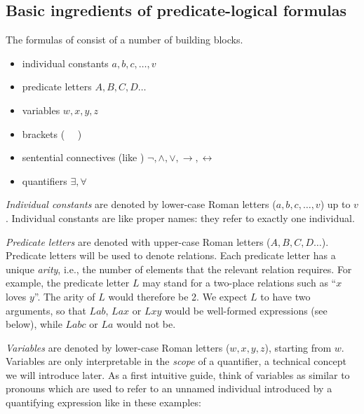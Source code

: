 \documentclass[nobib,nofonts]{tufte-handout}
\newcommand{\proplog}{\acro{PropLog}}
\newcommand{\predlog}{\acro{PredLog}}
\begin{document}
\subsection{Basic ingredients of predicate-logical formulas}

The formulas of \predlog consist of a number of building blocks.
\begin{itemize}
  \item individual constants \hfill $a,b,c, \dots, v$
  \item predicate letters \hfill $A, B, C, D \dots$
  \item variables \hfill $w, x,y,z$
  \item brackets \hfill ( \ \ )
  \item sentential connectives (like \proplog) \hfill $\neg, \wedge, \vee, \rightarrow, \leftrightarrow$
  \item quantifiers \hfill $\exists, \forall$
\end{itemize}

\emph{Individual constants} are denoted by lower-case Roman letters ($a, b, c, \dots, v $) up to $v$.
Individual constants are like proper names: they refer to exactly one individual.

\emph{Predicate letters} are denoted with upper-case Roman letters ($A, B, C, D \dots$).
Predicate letters will be used to denote relations.
Each predicate letter has a unique \emph{arity}, i.e., the number of elements that the relevant relation requires.
For example, the predicate letter $L$ may stand for a two-place relations such as ``$x$ loves $y$''.
The arity of $L$ would therefore be 2.
We expect $L$ to have two arguments, so that $Lab$, $Lax$ or $Lxy$ would be well-formed expressions (see below), while $Labc$ or $La$ would not be.

\emph{Variables} are denoted by lower-case Roman letters ($w, x,y,z$), starting from $w$.
Variables are only interpretable in the \emph{scope} of a quantifier, a technical concept we will introduce later.
As a first intuitive guide, think of variables as similar to pronouns which are used to refer to an unnamed individual introduced by a quantifying expression like in these examples:
\end{document}
